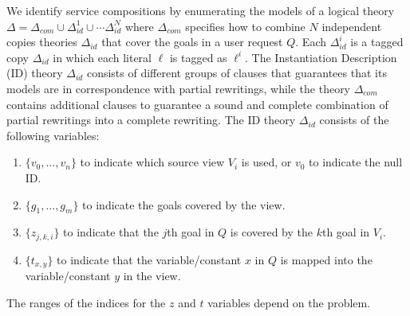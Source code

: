 \documentclass{llncs}
\begin{document}
{We identify service compositions  by enumerating the models of a logical
theory $\Delta=\Delta_{com}\cup\Delta_{id}^1\cup\cdots\Delta_{id}^N$
where $\Delta_{com}$ specifies how to combine $N$ independent copies theories
$\Delta_{id}$ that cover the goals in a user request $Q$.
Each $\Delta^i_{id}$ is a tagged copy $\Delta_{id}$ in which each literal
$\ell$ is tagged as $\ell^i$.
The Instantiation Description (ID) theory $\Delta_{id}$ consists of different
groups of clauses that guarantees that its models are in correspondence with
partial rewritings, while the theory $\Delta_{com}$ contains additional
clauses to guarantee a sound and complete combination of partial rewritings
into a complete rewriting.
The ID theory $\Delta_{id}$ consists of the following variables:
\begin{enumerate}[--]
\item $\{v_0,\ldots,v_n\}$ to indicate which source view $V_i$ is used, or $v_0$ to indicate the null ID.
\item $\{g_1,\ldots,g_m\}$ to indicate the goals covered by the view.
\item $\{z_{j,k,i}\}$ to indicate that the $j$th goal in $Q$ is covered by the $k$th goal in $V_i$.
\item $\{t_{x,y}\}$ to indicate that the variable/constant $x$ in $Q$ is mapped into the
      variable/constant $y$ in the view.
\end{enumerate}
The ranges of the indices for the $z$ and $t$ variables depend on the problem.

}
\end{document}
